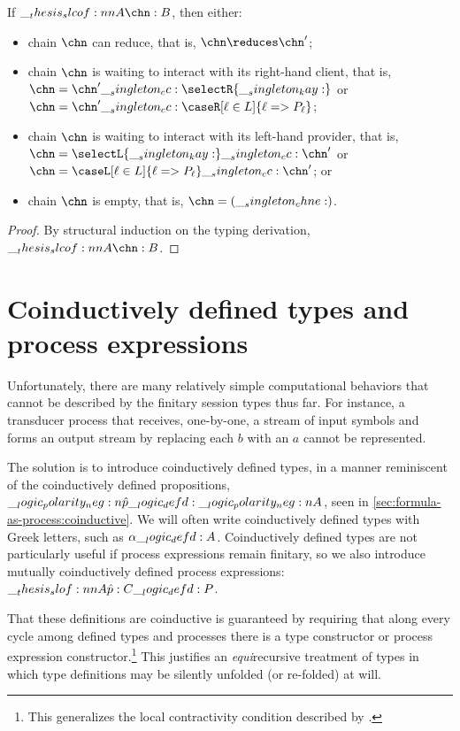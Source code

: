 \begin{theorem}[Progress]
  If $\slcof{A |- \chn : B}$, then either:
  \begin{itemize}[nosep]
  \item chain $\chn$ can reduce, that is, $\chn \reduces \chn'$;
  \item chain $\chn$ is waiting to interact with its right-hand client, that is, $\chn = \chn' \cc \selectR{\kay}$ or $\chn = \chn' \cc \caseR[\ell \in L]{\ell => P_{\ell}}$;
  \item chain $\chn$ is waiting to interact with its left-hand provider, that is, $\chn = \selectL{\kay} \cc \chn'$ or $\chn = \caseL[\ell \in L]{\ell => P_{\ell}} \cc \chn'$; or
  \item chain $\chn$ is empty, that is, $\chn = (\chne)$.
  \end{itemize}
\end{theorem}
\begin{proof}
  By structural induction on the typing derivation, $\slcof{A |- \chn : B}$.
\end{proof}

\section{Coinductively defined types and process expressions}\label{sec:process-chains:coinductive}

Unfortunately, there are many relatively simple computational behaviors that cannot be described by the finitary session types thus far.
For instance, a transducer process that receives, one-by-one, a stream of input symbols and forms an output stream by replacing each $b$ with an $a$ cannot be represented.

The solution is to introduce coinductively defined types, in a manner reminiscent of the coinductively defined propositions, $\__logic_polarity_neg:n {\hat{p}} \__logic_defd: \__logic_polarity_neg:n {A}$, seen in \cref{sec:formula-as-process:coinductive}.
We will often write coinductively defined types with Greek letters, such as $\alpha \__logic_defd: A$.
Coinductively defined types are not particularly useful if process expressions remain finitary, so we also introduce mutually coinductively defined process expressions: $\slof{A |- \defp{p} : C} \defd P$.

That these definitions are coinductive is guaranteed by requiring that along every cycle among defined types and processes there is a type constructor or process expression constructor.\footnote{This generalizes the local contractivity condition described by \textcite{Gay+Hole:AI05}.}
This justifies an \emph{equi}\-recursive treatment of types in which type definitions may be silently unfolded (or re-folded) at will.

